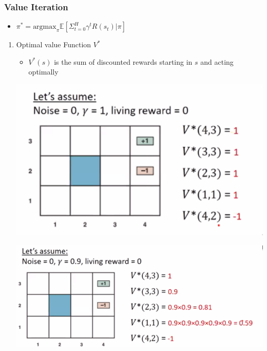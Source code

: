 \documentclass[11pt]{article}
\begin{document}
\subsubsection{Value Iteration}
\label{sec:org904e045}
\begin{itemize}
\item \(\pi^*=\text{argmax}_\pi \mathbb{E} [\Sigma^H_{t=0}\gamma^tR(s_t) | \pi]\)
\end{itemize}
\begin{enumerate}
\item Optimal value Function \(V^*\)
\label{sec:orgd129447}
\begin{itemize}
\item \(V^*(s)\) is the sum of discounted rewards starting in \(s\) and acting optimally
\end{itemize}
\begin{center}
\includegraphics[width=.9\linewidth]{images/2020-09-08_17-31-58_screenshot.png}
\end{center}

\begin{center}
\includegraphics[width=.9\linewidth]{images/2020-09-08_17-34-27_screenshot.png}
\end{center}


\end{enumerate}
\end{document}
